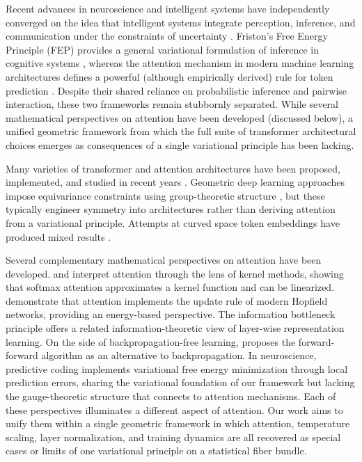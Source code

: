 \documentclass[twoside,11pt]{article}
\begin{document}
Recent advances in neuroscience and intelligent systems have independently converged on the idea that intelligent systems integrate perception, inference, and communication under the constraints of uncertainty \citep{bahdanau2014neural,amari1998natural,bronstein2021geometric,foerster2016learning,wooldridge2009introduction}. Friston's Free Energy Principle (FEP) provides a general variational formulation of inference in cognitive systems \citep{friston2010free,parr2022active,friston2017graphical,ramstead2020variational}, whereas the attention mechanism in modern machine learning architectures defines a powerful (although empirically derived) rule for token prediction \citep{clark2019does,vaswani2017attention}. Despite their shared reliance on probabilistic inference and pairwise interaction, these two frameworks remain stubbornly separated. While several mathematical perspectives on attention have been developed (discussed below), a unified geometric framework from which the full suite of transformer architectural choices emerges as consequences of a single variational principle has been lacking.

Many varieties of transformer and attention architectures have been proposed, implemented, and studied in recent years \citep{fuchs2020se3,thomas2018tensor}. Geometric deep learning approaches impose equivariance constraints using group-theoretic structure \citep{kondor2018generalization,finzi2020generalizing,bronstein2021geometric}, but these typically engineer symmetry into architectures rather than deriving attention from a variational principle. Attempts at curved space token embeddings have produced mixed results \citep{bonnabel2013stochastic,absil2008optimization}.

Several complementary mathematical perspectives on attention have been developed. \citet{tsai2019transformer} and \citet{katharopoulos2020transformers} interpret attention through the lens of kernel methods, showing that softmax attention approximates a kernel function and can be linearized. \citet{ramsauer2021hopfield} demonstrate that attention implements the update rule of modern Hopfield networks, providing an energy-based perspective. The information bottleneck principle \citep{tishby2015deep,shwartz2017opening} offers a related information-theoretic view of layer-wise representation learning. On the side of backpropagation-free learning, \citet{hinton2022forward} proposes the forward-forward algorithm as an alternative to backpropagation. In neuroscience, predictive coding \citep{rao1999predictive,bogacz2017tutorial,millidge2021predictive} implements variational free energy minimization through local prediction errors, sharing the variational foundation of our framework but lacking the gauge-theoretic structure that connects to attention mechanisms. Each of these perspectives illuminates a different aspect of attention. Our work aims to unify them within a single geometric framework in which attention, temperature scaling, layer normalization, and training dynamics are all recovered as special cases or limits of one variational principle on a statistical fiber bundle.
\end{document}
